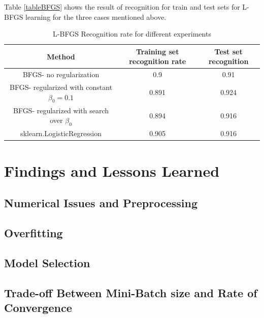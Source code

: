 \documentclass[twoside,12pt]{article}
\begin{document}
Table \ref{tableBFGS} shows the result of recognition for train and test sets for L-BFGS learning for the three cases mentioned above.\\


\begin{table}[h!]\footnotesize
\label{tblbfgsrates}
  \caption{L-BFGS Recognition rate for different experiments}
\begin{center}
    \begin{tabular}{| c | c | c | }
    \hline
    \textbf{ Method} & \textbf{Training set recognition rate} & \textbf{Test set recognition} \\ \hline
    BFGS- no regularization & 0.9 & 0.91  \\ \hline
    BFGS- regularized with constant $\beta_0=0.1$ & 0.891 & 0.924  \\ \hline
    BFGS- regularized with search over $\beta_0$ & 0.894 & 0.916  \\ \hline
    sklearn.LogisticRegression & 0.905 & 0.916  \\ \hline
    
    \end{tabular}
\end{center}

\end{table}

\section{Findings and Lessons Learned}
\subsection{Numerical Issues and Preprocessing}
\subsection{Overfitting}
\subsection{Model Selection}
\subsection{Trade-off Between Mini-Batch size and Rate of Convergence}
\end{document}
